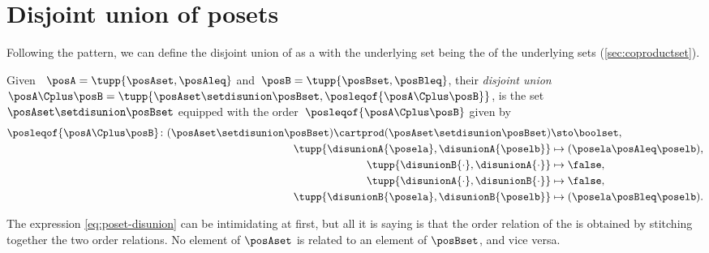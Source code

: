 
\section{Disjoint union of posets}

Following the pattern, we can define the disjoint union of  as a  with the underlying set being the  of the underlying sets (\cref{sec:coproductset}).

\begin{definition}
    \label{def:disjoint-union-of-posets}
    Given ~$\posA=\tupp{\posAset, \posAleq}$ and~$\posB=\tupp{\posBset, \posBleq}$, their \emph{disjoint union}~$\posA\Cplus\posB=\tupp{\posAset \setdisunion \posBset, \posleqof{\posA \Cplus \posB}}$, is the set $\posAset \setdisunion \posBset$ equipped with the order~$\posleqof{\posA \Cplus \posB}$ given by
    \begin{equation} \label{eq:poset-disunion}
        \begin{aligned}
            \posleqof{\posA\Cplus\posB}\colon
            (\posAset\setdisunion\posBset)\cartprod (\posAset
            \setdisunion\posBset)                           & \sto \boolset, \\
            \tupp{\disunionA{\posela},\disunionA{\poselb} } &
            \mapsto (\posela\posAleq \poselb), \\
            \tupp{\disunionB{\cdot},\disunionA{\cdot} }     &
            \mapsto \false, \\
            \tupp{\disunionA{\cdot},\disunionB{\cdot}}      &
            \mapsto \false, \\
            \tupp{\disunionB{\posela},\disunionB{\poselb}}  &
            \mapsto (\posela\posBleq \poselb).
        \end{aligned}
    \end{equation}
\end{definition}

The expression \cref{eq:poset-disunion} can be intimidating at first, but all it is saying is that the order relation of the  is obtained by stitching together the two order relations.
No element of $\posAset$ is related to an element of $\posBset$, and vice versa.

